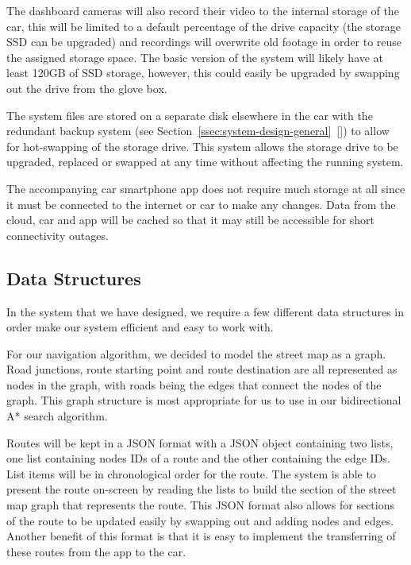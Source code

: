 \documentclass{article}
\begin{document}
The dashboard cameras will also record their video to the internal storage of the car, this will be limited to a default percentage of the drive capacity (the storage SSD can be upgraded) and recordings will overwrite old footage in order to reuse the assigned storage space. The basic version of the system will likely have at least 120GB of SSD storage, however, this could easily be upgraded by swapping out the drive from the glove box.

The system files are stored on a separate disk elsewhere in the car with the redundant backup system (see Section~\ref{ssec:system-design-general}~[]) to allow for hot-swapping of the storage drive. This system allows the storage drive to be upgraded, replaced or swapped at any time without affecting the running system.

The accompanying car smartphone app does not require much storage at all since it must be connected to the internet or car to make any changes. Data from the cloud, car and app will be cached so that it may still be accessible for short connectivity outages.

\subsection{Data Structures}\label{ssec:data-structures} %
In the system that we have designed, we require a few different data structures in order make our system efficient and easy to work with.

For our navigation algorithm, we decided to model the street map as a graph. Road junctions, route starting point and route destination are all represented as nodes in the graph, with roads being the edges that connect the nodes of the graph. This graph structure is most appropriate for us to use in our bidirectional A* search algorithm.

Routes will be kept in a JSON format with a JSON object containing two lists, one list containing nodes IDs of a route and the other containing the edge IDs. List items will be in chronological order for the route. The system is able to present the route on-screen by reading the lists to build the section of the street map graph that represents the route. This JSON format also allows for sections of the route to be updated easily by swapping out and adding nodes and edges. Another benefit of this format is that it is easy to implement the transferring of these routes from the app to the car.
\end{document}
